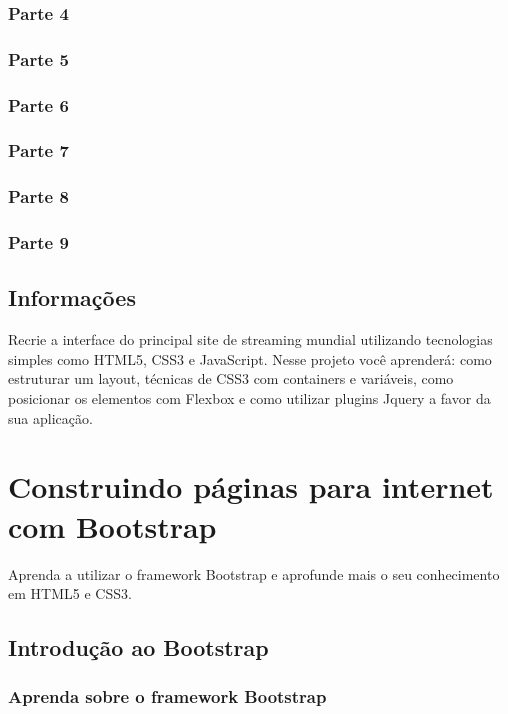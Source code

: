 \documentclass[12pt,a4paper]{article}
\begin{document}
	\subsubsection{Parte 4}
	
	\subsubsection{Parte 5}
	
	\subsubsection{Parte 6}
	
	\subsubsection{Parte 7}
	
	\subsubsection{Parte 8}
	
	\subsubsection{Parte 9}
	
	\subsection{Informações}
	
	Recrie a interface do principal site de streaming mundial utilizando tecnologias simples como HTML5, CSS3 e JavaScript. Nesse projeto você aprenderá: como estruturar um layout, técnicas de CSS3 com containers e variáveis, como posicionar os elementos com Flexbox e como utilizar plugins Jquery a favor da sua aplicação.
	
	\section{Construindo páginas para internet com Bootstrap}
	
	Aprenda a utilizar o framework Bootstrap e aprofunde mais o seu conhecimento em HTML5 e CSS3.
	
	\subsection{Introdução ao Bootstrap}
	\subsubsection{Aprenda sobre o framework Bootstrap}
	
\end{document}
